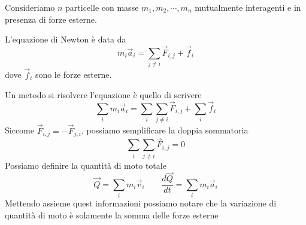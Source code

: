 \documentclass[a4paper]{article}
\begin{document}
Consideriamo \(n\) particelle con masse \(m_1, m_2, \cdots, m_n\)
mutualmente interagenti e in presenza di forze esterne.

L'equazione di Newton è data da
\[
    m_i\vec{a}_i = \sum_{j \neq i} \vec{F}_{i,j} + \vec{f}_{i}
\]
dove \(\vec{f}_i\) sono le forze esterne.

Un metodo si risolvere l'equazione è quello di scrivere
\[
    \sum_i m_i\vec{a}_i = \sum_i \sum_{j \neq i} \vec{F}_{i,j} + \sum_i \vec{f}_i
\]
Siccome \(\vec{F}_{i,j} = -\vec{F}_{j,i}\), possiamo semplificare la doppia sommatoria
\[
    \sum_i \sum_{j \neq i} \vec{F}_{i,j} = 0
\]
Possiamo definire la quantità di moto totale
\[
    \vec{Q} = \sum_i m_i\vec{v}_i \qquad \frac{d\vec{Q}}{dt} = \sum_i m_i\vec{a}_i
\]
Mettendo assieme quest informazioni possiamo notare che la variazione di quantità di moto
è solamente la somma delle forze esterne

\end{document}
